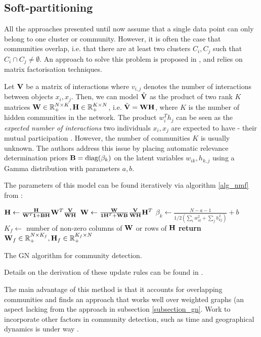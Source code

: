 \documentclass[../main.tex]{subfiles} \label{chapter_soa}
\begin{document}
\subsection{Soft-partitioning} \label{subsection_softpart}
All the approaches presented until now assume that a single data point can only belong to one cluster or community. However, it is often the case that communities overlap, i.e. that there are at least two clusters $C_i, C_j$ such that $C_i \cap C_j \neq \emptyset$. An approach to solve this problem is proposed in \cite{Psorakis2010}, and relies on matrix factorisation techniques.
\par Let $\mathbf{V}$ be a matrix of interactions where $v_{i,j}$ denotes the number of interactions between objects $x_i, x_j$. Then, we can model $\hat{\mathbf{V}}$ as the product of two rank $K$ matrices $\mathbf{W} \in \mathbb{R}_+^{N \times K}, \mathbf{H}\in \mathbb{R}_+^{K \times N}$, i.e. $\hat{\mathbf{V}} = \mathbf{WH}$, where $K$ is the number of hidden communities in the network. The product $w_i^Th_j$ can be seen as the \emph{expected number of interactions} two individuals $x_i, x_j$ are expected to have - their mutual participation \cite{Psorakis2010}. However, the number of communities $K$ is usually unknown. The authors address this issue by placing automatic relevance determination priors $\mathbf{B} = \text{diag}(\beta_k)$ on the latent variables $w_{ik}, h_{k, j}$ using a Gamma distribution with parameters $a, b$\cite{Psorakis2010a}.
\par The parameters of this model can be found iteratively via algorithm \ref{alg_nmf} from \cite{Psorakis2010a}:
\begin{algorithm}
\begin{algorithmic}[1]
\Repeat
    \State $\mathbf{H} \gets \frac{\mathbf{H}}{\mathbf{W}^T\mathbf{1}+\mathbf{BH}}\mathbf{W}^T\mathbf{\frac{\mathbf{V}}{\mathbf{WH}}}$
    \State $\mathbf{W} \gets \frac{\mathbf{W}}{\mathbf{1}\mathbf{H}^T+\mathbf{WB}}\mathbf{\frac{\mathbf{V}}{\mathbf{WH}}}\mathbf{H}^T$
    \State $\beta_k \gets \frac{N-a-1}{1/2(\sum_i{w_{ik}^2} + \sum_j{h_{kj}^2})} + b$
$K_f \gets $ number of non-zero columns of $\mathbf{W}$ or rows of $\mathbf{H}$
\State \textbf{return} $\mathbf{W}_f \in \mathbb{R}_+^{N\times K_f}, \mathbf{H}_f\in\mathbb{R}_+^{K_f\times N}$
\EndFunction
\caption{The GN algorithm for community detection.}\label{alg_nmf}
\end{algorithmic}
\end{algorithm}
\par Details on the derivation of these update rules can be found in \cite{Psorakis2010a,Psorakis2010a}. 
\par The main advantage of this method is that it accounts for overlapping communities and finds an approach that works well over weighted graphs (an aspect lacking from the approach in subsection \ref{subsection_gn}. Work to incorporate other factors in community detection, such as time and geographical dynamics is under way \cite{Psorakis2010}.
\end{document}
